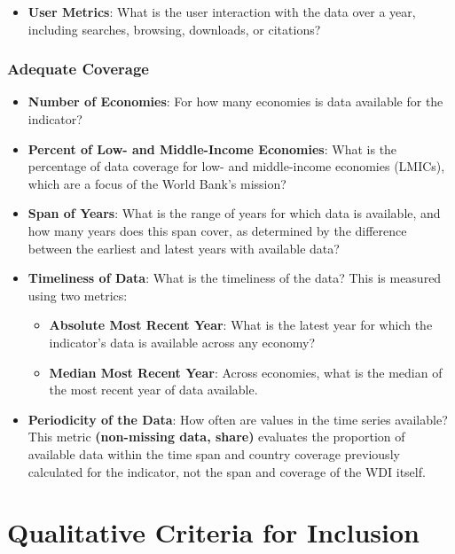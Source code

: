 \documentclass[
  11pt,
  a4paper,
  DIV=11,
  numbers=noendperiod]{scrreprt}
\providecommand{\tightlist}{%
  \setlength{\itemsep}{0pt}\setlength{\parskip}{0pt}}\usepackage{longtable,booktabs,array}
\begin{document}
\begin{itemize}
\tightlist
\item
  \textbf{User Metrics}: What is the user interaction with the data over
  a year, including searches, browsing, downloads, or citations?
\end{itemize}

\subsubsection*{\texorpdfstring{\textbf{Adequate
Coverage}}{Adequate Coverage}}\label{adequate-coverage}

\begin{itemize}
\tightlist
\item
  \textbf{Number of Economies}: For how many economies is data available
  for the indicator?
\item
  \textbf{Percent of Low- and Middle-Income Economies}: What is the
  percentage of data coverage for low- and middle-income economies
  (LMICs), which are a focus of the World Bank's mission?
\item
  \textbf{Span of Years}: What is the range of years for which data is
  available, and how many years does this span cover, as determined by
  the difference between the earliest and latest years with available
  data?
\item
  \textbf{Timeliness of Data}: What is the timeliness of the data? This
  is measured using two metrics:

  \begin{itemize}
  \tightlist
  \item
    \textbf{Absolute Most Recent Year}: What is the latest year for
    which the indicator's data is available across any economy?
  \item
    \textbf{Median Most Recent Year}: Across economies, what is the
    median of the most recent year of data available.
  \end{itemize}
\item
  \textbf{Periodicity of the Data}: How often are values in the time
  series available? This metric \textbf{(non-missing data, share)}
  evaluates the proportion of available data within the time span and
  country coverage previously calculated for the indicator, not the span
  and coverage of the WDI itself.
\end{itemize}

\section{Qualitative Criteria for
Inclusion}\label{qualitative-criteria-for-inclusion}
\end{document}
